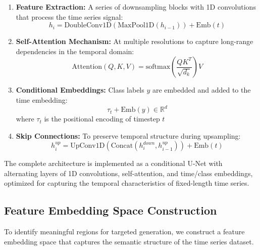 \documentclass{article}
\begin{document}
\begin{enumerate}
    \item \textbf{Feature Extraction:} A series of downsampling blocks with 1D convolutions that process the time series signal:
    \begin{equation}
    h_i = \text{DoubleConv1D}(\text{MaxPool1D}(h_{i-1})) + \text{Emb}(t)
    \end{equation}

    \item \textbf{Self-Attention Mechanism:} At multiple resolutions to capture long-range dependencies in the temporal domain:
    \begin{equation}
    \text{Attention}(Q, K, V) = \text{softmax}\left(\frac{QK^T}{\sqrt{d_k}}\right)V
    \end{equation}

    \item \textbf{Conditional Embeddings:} Class labels $y$ are embedded and added to the time embedding:
    \begin{equation}
    \tau_t + \text{Emb}(y) \in \mathbb{R}^d
    \end{equation}
    where $\tau_t$ is the positional encoding of timestep $t$

    \item \textbf{Skip Connections:} To preserve temporal structure during upsampling:
    \begin{equation}
    h_i^{up} = \text{UpConv1D}(\text{Concat}(h_i^{down}, h_{i-1}^{up})) + \text{Emb}(t)
    \end{equation}
\end{enumerate}

The complete architecture is implemented as a conditional U-Net with alternating layers of 1D convolutions, self-attention, and time/class embeddings, optimized for capturing the temporal characteristics of fixed-length time series.

\subsection{Feature Embedding Space Construction}

To identify meaningful regions for targeted generation, we construct a feature embedding space that captures the semantic structure of the time series dataset.
\end{document}

